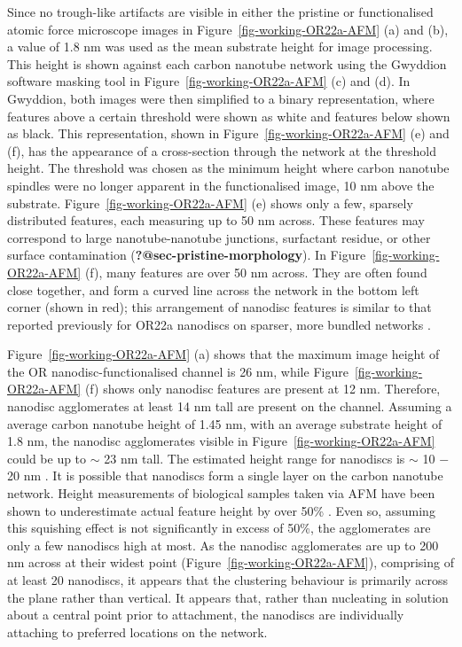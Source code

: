\documentclass[
  a4paper,
]{scrbook}
\begin{document}
Since no trough-like artifacts are visible in either the pristine or
functionalised atomic force microscope images in
Figure~\ref{fig-working-OR22a-AFM} (a) and (b), a value of 1.8 nm was
used as the mean substrate height for image processing. This height is
shown against each carbon nanotube network using the Gwyddion software
masking tool in Figure~\ref{fig-working-OR22a-AFM} (c) and (d). In
Gwyddion, both images were then simplified to a binary representation,
where features above a certain threshold were shown as white and
features below shown as black. This representation, shown in
Figure~\ref{fig-working-OR22a-AFM} (e) and (f), has the appearance of a
cross-section through the network at the threshold height. The threshold
was chosen as the minimum height where carbon nanotube spindles were no
longer apparent in the functionalised image, 10 nm above the substrate.
Figure~\ref{fig-working-OR22a-AFM} (e) shows only a few, sparsely
distributed features, each measuring up to 50 nm across. These features
may correspond to large nanotube-nanotube junctions, surfactant residue,
or other surface contamination (\textbf{?@sec-pristine-morphology}). In
Figure~\ref{fig-working-OR22a-AFM} (f), many features are over 50 nm
across. They are often found close together, and form a curved line
across the network in the bottom left corner (shown in red); this
arrangement of nanodisc features is similar to that reported previously
for OR22a nanodiscs on sparser, more bundled networks
\autocite{Murugathas2019a}.

Figure~\ref{fig-working-OR22a-AFM} (a) shows that the maximum image
height of the OR nanodisc-functionalised channel is 26 nm, while
Figure~\ref{fig-working-OR22a-AFM} (f) shows only nanodisc features are
present at 12 nm. Therefore, nanodisc agglomerates at least 14 nm tall
are present on the channel. Assuming a average carbon nanotube height of
1.45 nm, with an average substrate height of 1.8 nm, the nanodisc
agglomerates visible in Figure~\ref{fig-working-OR22a-AFM} could be up
to \(\sim\) 23 nm tall. The estimated height range for nanodiscs is
\(\sim\) 10 \(-\) 20 nm
\autocite{Nath2007,Bayburt2010,Murugathas2020,Cheema2021}. It is
possible that nanodiscs form a single layer on the carbon nanotube
network. Height measurements of biological samples taken via AFM have
been shown to underestimate actual feature height by over 50\%
\autocite{Vobornik2023}. Even so, assuming this squishing effect is not
significantly in excess of 50\%, the agglomerates are only a few
nanodiscs high at most. As the nanodisc agglomerates are up to 200 nm
across at their widest point (Figure~\ref{fig-working-OR22a-AFM}),
comprising of at least 20 nanodiscs, it appears that the clustering
behaviour is primarily across the plane rather than vertical. It appears
that, rather than nucleating in solution about a central point prior to
attachment, the nanodiscs are individually attaching to preferred
locations on the network.
\end{document}
